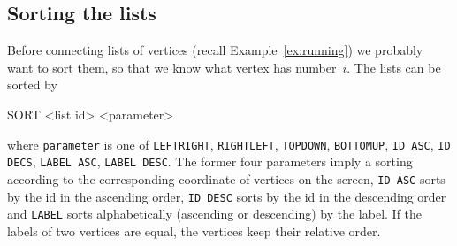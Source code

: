 \subsection{Sorting the lists}

Before connecting lists of vertices (recall Example~\ref{ex:running})
we probably want to sort them, so that we know what vertex has
number~$i$. The lists can be sorted by

\begin{tcolorbox}[colback=lightpink]
  SORT <list id> <parameter>
\end{tcolorbox}
where \texttt{parameter} is one of \texttt{LEFTRIGHT},
\texttt{RIGHTLEFT}, \texttt{TOPDOWN}, \texttt{BOTTOMUP}, \texttt{ID
  ASC}, \texttt{ID DECS}, \texttt{LABEL ASC}, \texttt{LABEL DESC}. The
former four parameters imply a sorting according to the corresponding
coordinate of vertices on the screen, \texttt{ID ASC} sorts by the id
in  the ascending order, \texttt{ID DESC} sorts by the id
in  the descending order and \texttt{LABEL} sorts alphabetically
(ascending or descending) by the label. If the labels of two vertices
are equal, the vertices keep their relative order.

